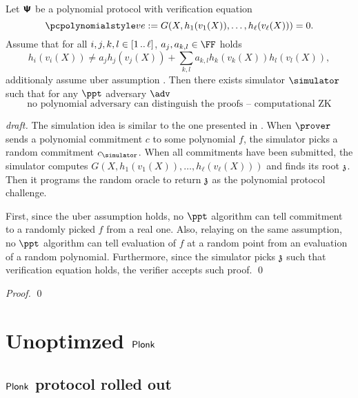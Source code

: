 \documentclass[runningheads,11pt]{llncs}
\begin{document}
\begin{lemma}
  Let $\bm{\mathsf{\Psi}}$ be a polynomial protocol with verification equation
  \[
    \vereq := G(X, h_1(v_1(X)), \ldots, h_\ell(v_\ell (X))) = 0.
  \]
  Assume that for all $i, j, k, l \in [1 \, .. \, \ell]$, $a_j, a_{k, l} \in \FF$ holds
  \[
    h_i(v_i(X)) \neq a_j h_j(v_j(X)) + \sum_{k, l} a_{k, l} h_k(v_k (X)) h_l (v_l (X)),
  \]
  additionaly assume uber assumption \cite{}.
  Then there exists simulator $\simulator$ such that for any $\ppt$ adversary
  $\adv$
  \[
    \text{no polynomial adversary can distinguish the proofs -- computational ZK}
  \]
\end{lemma}
\begin{proof}[draft]
  The simulation idea is similar to the one presented in
  \cite{EPRINT:CFFQR20}. When $\prover$ sends a polynomial commitment $c$ to
  some polynomial $f$, the simulator picks a random commitment
  $c_\simulator$. When all commitments have been submitted, the simulator
  computes $ G(X, h_1(v_1(X)), \ldots, h_\ell(v_\ell (X)))$ and finds its root
  $\mathfrak{z}$. Then it programs the random oracle to return $\mathfrak{z}$ as the polynomial
  protocol challenge.

  First, since the uber assumption holds, no $\ppt$ algorithm can tell
  commitment to a randomly picked $f$ from a real one.  Also, relaying on the same assumption, no $\ppt$
  algorithm can tell evaluation of $f$ at a random point from an evaluation of a
  random polynomial.
  Furthermore, since the simulator picks $\mathfrak{z}$ such that verification equation
  holds, the verifier accepts such proof. 
  \qed
\end{proof}

\begin{theorem}
\end{theorem}
\begin{proof}
  \qed
\end{proof}




\appendix
\section{Unoptimzed $\textnormal{\textsf{Plonk}}$}
\subsection{$\textnormal{\textsf{Plonk}}$ protocol rolled out}
\label{sec:plonk_explained}
\newcommand{\vql}{\vec{q_{L}}}
\newcommand{\vqr}{\vec{q_{R}}}
\newcommand{\vqm}{\vec{q_{M}}}
\newcommand{\vqo}{\vec{q_{O}}}
\newcommand{\vx}{\vec{x}}
\newcommand{\vqc}{\vec{q_{C}}}
\end{document}
